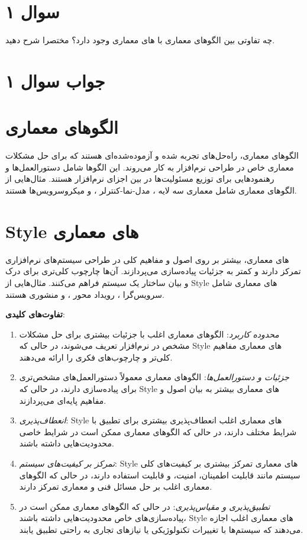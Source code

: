 \section*{سوال ۱}

چه تفاوتی بین الگوهای معماری با 
های معماری وجود دارد؟ مختصرا شرح دهید.

\section*{جواب سوال ۱}

\section*{الگوهای معماری }
الگوهای معماری، راه‌حل‌های تجربه شده و آزموده‌شده‌ای هستند که برای حل مشکلات معماری خاص در طراحی نرم‌افزار به کار می‌روند. این الگوها شامل دستورالعمل‌ها و رهنمودهایی برای توزیع مسئولیت‌ها در بین اجزای نرم‌افزار هستند. مثال‌هایی از الگوهای معماری شامل معماری سه لایه  ، مدل-نما-کنترلر ، و میکروسرویس‌ها  هستند.

\section*{Style های معماری }
 های معماری، بیشتر بر روی اصول و مفاهیم کلی در طراحی سیستم‌های نرم‌افزاری تمرکز دارند و کمتر به جزئیات پیاده‌سازی می‌پردازند. آن‌ها چارچوب کلی‌تری برای درک و بیان ساختار یک سیستم فراهم می‌کنند. مثال‌هایی از Style های معماری شامل سرویس‌گرا ، رویداد محور ، و منشوری  هستند.

\textbf{تفاوت‌های کلیدی}:
\begin{enumerate}
	\item \textit{محدوده کاربرد}: الگوهای معماری اغلب با جزئیات بیشتری برای حل مشکلات مشخص در نرم‌افزار تعریف می‌شوند، در حالی که Style های معماری مفاهیم کلی‌تر و چارچوب‌های فکری را ارائه می‌دهند.
	\item \textit{جزئیات و دستورالعمل‌ها}: الگوهای معماری معمولاً دستورالعمل‌های مشخص‌تری برای پیاده‌سازی دارند، در حالی که Style های معماری بیشتر به بیان اصول و مفاهیم پایه‌ای می‌پردازند.
	\item \textit{انعطاف‌پذیری}: Style های معماری اغلب انعطاف‌پذیری بیشتری برای تطبیق با شرایط مختلف دارند، در حالی که الگوهای معماری ممکن است در شرایط خاصی محدودیت‌هایی داشته باشند.
	\item \textit{تمرکز بر کیفیت‌های سیستم}: Style های معماری تمرکز بیشتری بر کیفیت‌های کلی سیستم مانند قابلیت اطمینان، امنیت، و قابلیت استفاده دارند، در حالی که الگوهای معماری اغلب بر حل مسائل فنی و معماری تمرکز دارند.
	\item \textit{تطبیق‌پذیری و مقیاس‌پذیری}: در حالی که الگوهای معماری ممکن است در پیاده‌سازی‌های خاص محدودیت‌هایی داشته باشند، Style های معماری اغلب اجازه می‌دهند که سیستم‌ها با تغییرات تکنولوژیکی یا نیازهای تجاری به راحتی تطبیق یابند.
\end{enumerate}